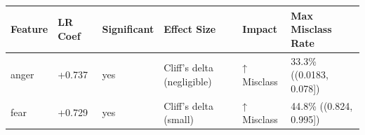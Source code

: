 \begin{tabular}{llllll}
\toprule
Feature & LR Coef & Significant & Effect Size & Impact & Max Misclass Rate \\
\midrule
anger & +0.737 & yes & Cliff's delta (negligible) & ↑ Misclass & 33.3\% ((0.0183, 0.078]) \\
fear & +0.729 & yes & Cliff's delta (small) & ↑ Misclass & 44.8\% ((0.824, 0.995]) \\
\bottomrule
\end{tabular}
